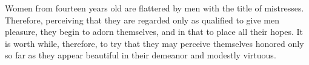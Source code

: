 Women  from  fourteen  years  old  are  flattered by  men  with  the  title  of
mistresses. Therefore, perceiving  that they are regarded only  as qualified to
give men  pleasure, they begin  to adorn themselves, and  in that to  place all
their  hopes. It  is worth  while,  therefore, to  try that  they may  perceive
themselves honored only  so far as they appear beautiful  in their demeanor and
modestly virtuous.
